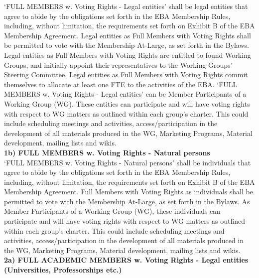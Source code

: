 \documentclass{article}
\begin{document}
‘FULL MEMBERS w. Voting Rights - Legal entities’ shall be legal entities that agree to abide by the obligations set forth in the EBA Membership Rules, including, without limitation, the requirements set forth on Exhibit B of the EBA Membership Agreement. 
Legal entities as Full Members with Voting Rights shall be permitted to vote with the Membership At-Large, as set forth in the Bylaws. 
Legal entities as Full Members with Voting Rights are entitled to found Working Groups, and initially appoint their representatives to the Working Groups’ Steering Committee. 
Legal entities as Full Members with Voting Rights commit themselves to allocate at least one FTE to the activities of the EBA. 
‘FULL MEMBERS w. Voting Rights - Legal entities’ can be Member Participants of a Working Group (WG). These entities can participate and will have voting rights with respect to WG matters as outlined within each group's charter. 
This could include scheduling meetings and activities, access/participation in the development of all materials produced in the WG, Marketing Programs, Material development, mailing lists and wikis. \\

\textbf{1b) FULL MEMBERS w. Voting Rights - Natural persons} \\

‘FULL MEMBERS w. Voting Rights - Natural persons’ shall be individuals that agree to abide by the obligations set forth in the EBA Membership Rules, including, without limitation, the requirements set forth on Exhibit B of the EBA Membership Agreement. 
Full Members with Voting Rights as individuals shall be permitted to vote with the Membership At-Large, as set forth in the Bylaws. 
As Member Participants of a Working Group (WG), these individuals can participate and will have voting rights with respect to WG matters as outlined within each group's charter. 
This could include scheduling meetings and activities, access/participation in the development of all materials produced in the WG, Marketing Programs, Material development, mailing lists and wikis. \\

\textbf{2a) FULL ACADEMIC MEMBERS w. Voting Rights - Legal entities (Universities, Professorships etc.)}
\end{document}
